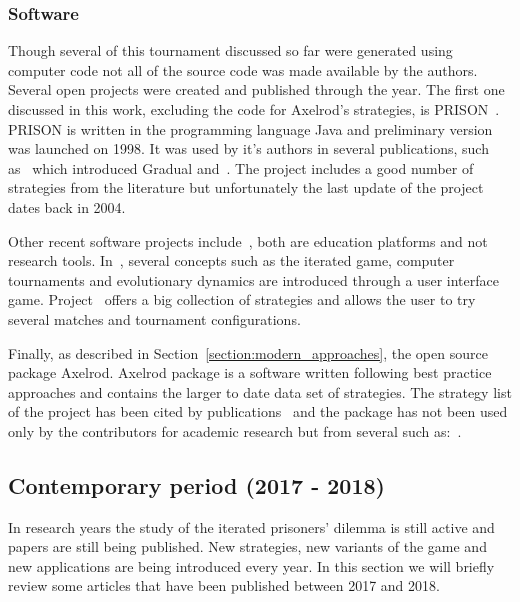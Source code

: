 \documentclass{article}
\theoremstyle{definition}
\begin{document}
\subsubsection{Software}

Though several of this tournament discussed so far were generated using computer
code not all of the source code was made available by the authors. Several
open projects were created and published through the year. The first one
discussed in this work, excluding the code for Axelrod's strategies, is 
PRISON~\cite{prison}. PRISON is written in the programming language Java and
preliminary version was launched on 1998. It was used by it's authors in several
publications, such as~\cite{Beaufils1997} which introduced Gradual and~\cite{Beaufils1988}.
The project includes a good number of strategies from the
literature but unfortunately the last update of the project dates back in 2004.

Other recent software projects include~\cite{pd_trust, pd_game}, both are education
platforms and not research tools. In~\cite{pd_trust}, several concepts such as
the iterated game, computer tournaments and evolutionary dynamics are introduced
through a user interface game. Project~\cite{pd_game} offers a big collection of
strategies and allows the user to try several matches and tournament configurations.

Finally, as described in Section~\ref{section:modern_approaches}, the open source
package Axelrod. Axelrod package is a software written following best practice
approaches and contains the larger to date data set of strategies. The strategy
list of the project has been cited by publications~\cite{Neumann2018} and
the package has not been used only by the contributors for academic research but
from several such as:~\cite{Latorre2018}.


\subsection{Contemporary period (2017 - 2018)}

In research years the study of the iterated prisoners' dilemma is still active
and papers are still being published. New strategies, new variants of the game
and new applications are being introduced every year. In this section we will
briefly review some articles that have been published between 2017 and 2018.
\end{document}
